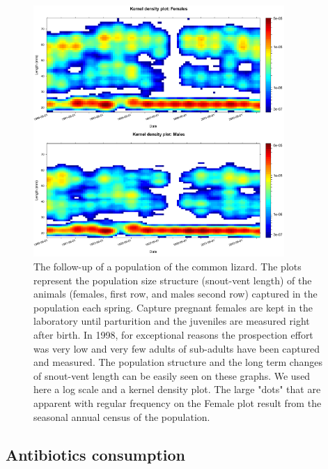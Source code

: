 \begin{figure}[!h] %
\centering
\includegraphics[width=0.85\textwidth]{2_Methodo/Fig/Fig22-3.pdf}
\caption[The follow-up of a population of the common lizard]{ The follow-up of a population of the common lizard. The plots represent the
population size structure (snout-vent length) of the animals (females, first
row, and males second row) captured in the population each spring. Capture
pregnant females are kept in the laboratory until parturition and the juveniles
are measured right after birth. In 1998, for exceptional reasons the prospection
effort was very low and very few adults of sub-adults have been captured and
measured. The population structure and the long term changes of snout-vent
length can be easily seen on these graphs. We used here a log scale and a kernel
density plot. The large "dots" that are apparent with regular frequency on the
Female plot result from the seasonal annual census of the population.
}
\label{Fig22-3}
\end{figure}


\subsection{Antibiotics consumption}

